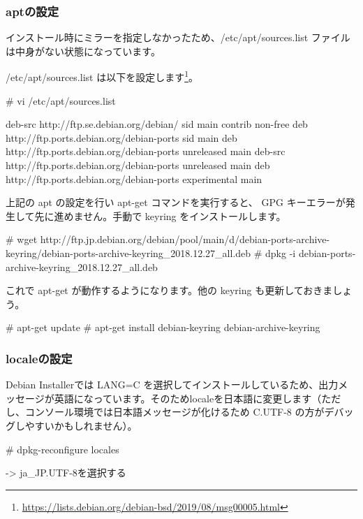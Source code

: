 \documentclass[mingoth,a4paper]{jsarticle}
\begin{document}
\subsubsection{aptの設定}

インストール時にミラーを指定しなかったため、/etc/apt/sources.list ファイルは中身がない状態になっています。

/etc/apt/sources.list は以下を設定します\footnote{\url{https://lists.debian.org/debian-bsd/2019/08/msg00005.html}}。

\begin{commandline}
# vi /etc/apt/sources.list
  
deb-src http://ftp.se.debian.org/debian/ sid main contrib non-free
deb http://ftp.ports.debian.org/debian-ports sid main
deb http://ftp.ports.debian.org/debian-ports unreleased main
deb-src http://ftp.ports.debian.org/debian-ports unreleased main
deb http://ftp.ports.debian.org/debian-ports experimental main
\end{commandline}

上記の apt の設定を行い apt-get コマンドを実行すると、 GPG キーエラーが発生して先に進めません。手動で keyring をインストールします。

\begin{commandline}
# wget http://ftp.jp.debian.org/debian/pool/main/d/debian-ports-archive-keyring/debian-ports-archive-keyring_2018.12.27_all.deb
# dpkg -i debian-ports-archive-keyring_2018.12.27_all.deb
\end{commandline}

これで apt-get が動作するようになります。他の keyring も更新しておきましょう。

\begin{commandline}
# apt-get update  
# apt-get install debian-keyring debian-archive-keyring
\end{commandline}


\subsubsection{localeの設定}

Debian Installerでは LANG=C を選択してインストールしているため、出力メッセージが英語になっています。そのためlocaleを日本語に変更します（ただし、コンソール環境では日本語メッセージが化けるため C.UTF-8 の方がデバッグしやすいかもしれません）。

\begin{commandline}
# dpkg-reconfigure locales

  -> ja_JP.UTF-8を選択する
\end{commandline}
\end{document}
